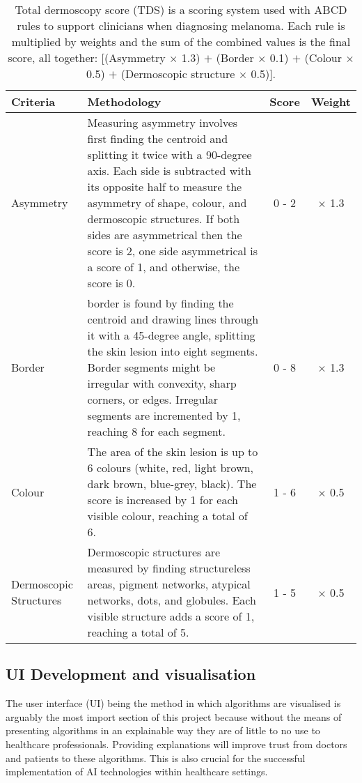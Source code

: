 \begin{table}
\small
\begin{tabular}{|p{2.5cm}|p{10cm}|c|c|}
	\hline
	Criteria & Methodology & Score & Weight \\
	\hline
	Asymmetry & Measuring asymmetry involves first finding the centroid and splitting it twice with a 90-degree axis. Each side is subtracted with its opposite half to measure the asymmetry of shape, colour, and dermoscopic structures. If both sides are asymmetrical then the score is 2, one side asymmetrical is a score of 1, and otherwise, the score is 0. & 0 - 2 & $\times$ 1.3 
	\\
	\hline
	Border & border is found by finding the centroid and drawing lines through it with a 45-degree angle, splitting the skin lesion into eight segments. Border segments might be irregular with convexity, sharp corners, or edges. Irregular segments are incremented by 1, reaching 8 for each segment.  & 0 - 8 & $\times$ 1.3 
	\\
	\hline
	Colour & The area of the skin lesion is up to 6 colours (white, red, light brown, dark brown, blue-grey, black). The score is increased by 1 for each visible colour, reaching a total of 6. & 1 - 6 & $\times$ 0.5 
	\\
	\hline
	Dermoscopic Structures & Dermoscopic structures are measured by finding structureless areas, pigment networks, atypical networks, dots, and globules. Each visible structure adds a score of 1, reaching a total of 5. & 1 - 5 & $\times$ 0.5 
	\\
	\hline	
\end{tabular}
\caption{Total dermoscopy score (TDS) is a scoring system used with ABCD rules to support clinicians when diagnosing melanoma\cite{Cognetta1994}. Each rule is multiplied by weights and the sum of the combined values is the final score, all together: [(Asymmetry $\times$ 1.3) $+$ (Border $\times$ 0.1) $+$ (Colour $\times$ 0.5) $+$ (Dermoscopic structure $\times$ 0.5)].}
\end{table} \label{TDS}

\subsection{UI Development and visualisation}
The user interface (UI) being the method in which algorithms are visualised is arguably the most import section of this project because without the means of presenting algorithms in an explainable way they are of little to no use to healthcare professionals. Providing explanations will improve trust from doctors and patients to these algorithms\cite{BarredoArrieta2020}. This is also crucial for the successful implementation of AI technologies within healthcare settings\cite{skar2017}.

